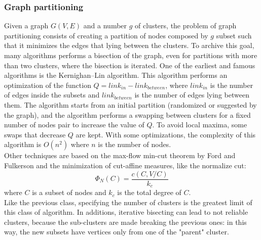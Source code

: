 \subsubsection{Graph partitioning} 
Given a graph $G(V, E)$ and a number $g$ of clusters, the problem of graph partitioning consists of creating a partition of nodes composed by $g$ subset such that it minimizes the edges that lying between the clusters. To archive this goal, many algorithms performs a bisection of the graph, even for partitions with more than two clusters, where the bisection is iterated.  One of the earliest and famous algorithms is the Kernighan–Lin algorithm. This algorithm performs an optimization of the function $Q = link_{in} - link_{between}$, where $ link_{in}$ is the number of edges inside the subsets and $link_{between}$ is the number of edges lying between them. The algorithm starts from an initial partition (randomized or suggested by the graph), and the algorithm performs a swapping between clusters for a fixed number of nodes pair to increase the value of $Q$. 
To avoid local maxima, some swaps that decrease $Q$ are kept. 
With some optimizations, the complexity of this algorithm is $O(n^2)$ where $n$ is the number of nodes.\\
Other techniques are based on the max-flow min-cut theorem by Ford and Fulkerson \cite{ford} and the minimization of cut-affine measures, like the normalize cut:
\begin{equation}
\Phi_N(C) = \frac{c(C, V/C)}{k_c}
\end{equation}
where $C$ is a subset of nodes and $k_c$ is the total degree of $C$. \\
Like the previous class, specifying the number of clusters is the greatest limit of this class of algorithm. In additions, iterative bisecting can lead to not reliable clusters, because the sub-clusters are made breaking the previous ones:  in this way, the new subsets have vertices only from one of the "parent" cluster.  
